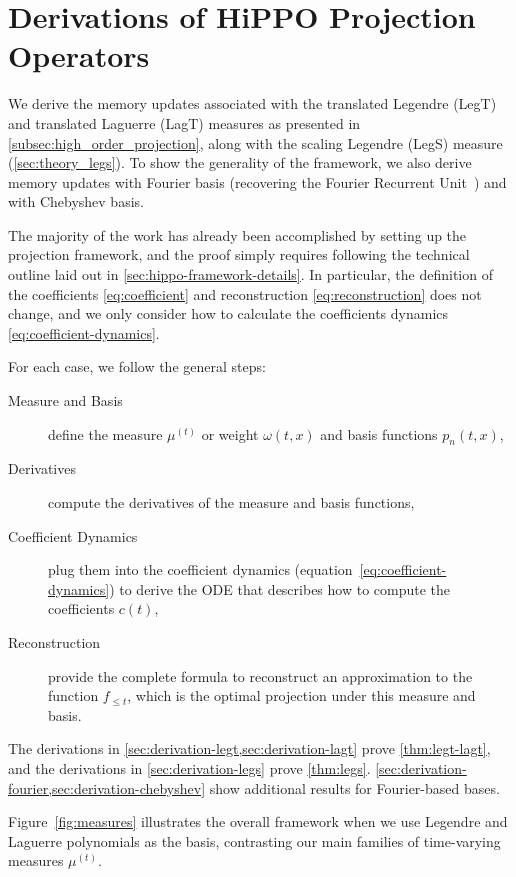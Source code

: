 \documentclass[\main/hippo]{subfiles}
\begin{document}
\section{Derivations of HiPPO Projection Operators}
\label{sec:derivations}

We derive the memory updates associated with the translated Legendre (LegT)
and translated Laguerre (LagT) measures as presented in
\cref{subsec:high_order_projection}, along with the scaling Legendre (LegS)
measure (\cref{sec:theory_legs}).
To show the generality of the framework, we also derive memory updates with
Fourier basis (recovering the Fourier Recurrent Unit~\citep{zhang2018learning})
and with Chebyshev basis.

The majority of the work has already been accomplished by setting up the
projection framework, and the proof simply requires following the technical
outline laid out in \cref{sec:hippo-framework-details}.
In particular, the definition of the coefficients \eqref{eq:coefficient} and reconstruction \eqref{eq:reconstruction} does not change,
and we only consider how to calculate the coefficients dynamics \eqref{eq:coefficient-dynamics}.

For each case, we follow the general steps:
\begin{description}%
  \item[Measure and Basis]
    define the measure $\mu^{(t)}$ or weight $\omega(t, x)$ and basis functions $p_n(t, x)$,
  \item[Derivatives]
    compute the derivatives of the measure and basis functions,
  \item[Coefficient Dynamics]
    plug them into the coefficient dynamics
    (equation~\eqref{eq:coefficient-dynamics}) to derive the ODE that describes how
    to compute the coefficients $c(t)$,
  \item[Reconstruction]
    provide the complete formula to reconstruct an approximation to the function $f_{\le t}$,
    which is the optimal projection under this measure and basis.
\end{description}

The derivations in \cref{sec:derivation-legt,sec:derivation-lagt}
prove \cref{thm:legt-lagt}, and the derivations in \cref{sec:derivation-legs}
prove \cref{thm:legs}.
\cref{sec:derivation-fourier,sec:derivation-chebyshev} show additional results for Fourier-based bases.

Figure~\ref{fig:measures} illustrates the overall framework when we use Legendre
and Laguerre polynomials as the basis,
contrasting our main families of time-varying measures $\mu^{(t)}$.
\end{document}
